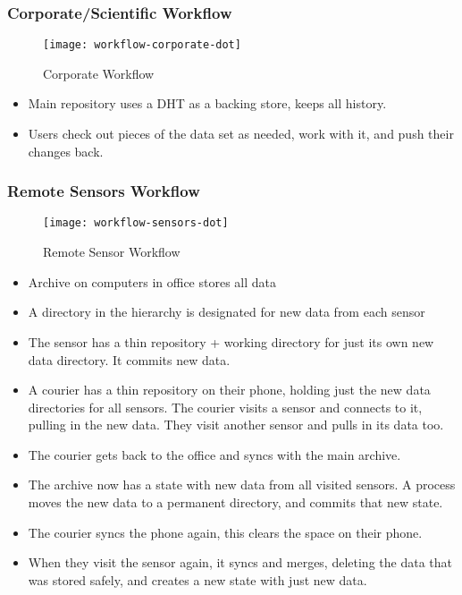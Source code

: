 \documentclass[a4paper]{article}
\begin{document}
\subsubsection{Corporate/Scientific Workflow}

  \begin{figure}[h]
    \caption{Corporate Workflow}
    \label{fig:workflow-corporate}
    \centering
      \texttt{[image: workflow-corporate-dot]}
  \end{figure}

  \begin{itemize}
  \item
    Main repository uses a DHT as a backing store, keeps all history.
  \item
    Users check out pieces of the data set as needed, work with it, and
    push their changes back.
  \end{itemize}

\subsubsection{Remote Sensors Workflow}

  \begin{figure}[h]
    \caption{Remote Sensor Workflow}
    \label{fig:workflow-sensors}
    \centering
      \texttt{[image: workflow-sensors-dot]}
  \end{figure}

  \begin{itemize}
  \item
    Archive on computers in office stores all data
  \item
    A directory in the hierarchy is designated for new data from each sensor
  \item
    The sensor has a thin repository + working directory for just its own new
    data directory. It commits new data.
  \item
    A courier has a thin repository on their phone, holding just the new data
    directories for all sensors. The courier visits a sensor and connects to it,
    pulling in the new data. They visit another sensor and pulls in its data
    too.
  \item
    The courier gets back to the office and syncs with the main archive.
  \item
    The archive now has a state with new data from all visited sensors. A
    process moves the new data to a permanent directory, and commits that new
    state.
  \item
    The courier syncs the phone again, this clears the space on their phone.
  \item
    When they visit the sensor again, it syncs and merges, deleting the data
    that was stored safely, and creates a new state with just new data.
  \end{itemize}
\end{document}
